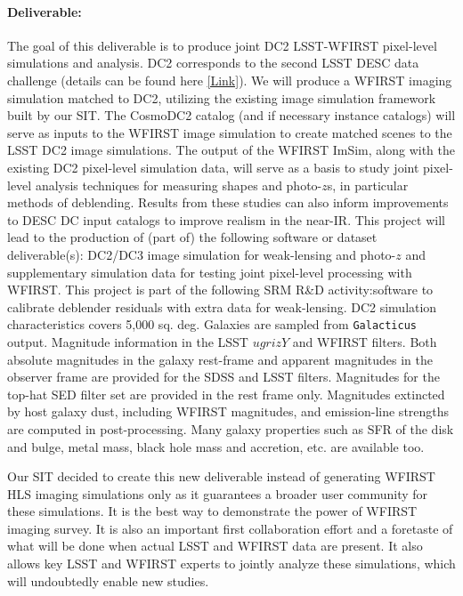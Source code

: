 \paragraph*{Deliverable:} The goal of this deliverable is to produce joint DC2
LSST-WFIRST pixel-level simulations and analysis. DC2 corresponds to the second
LSST DESC data challenge (details can be found here
\href{https://github.com/LSSTDESC/DC2-production/tree/master/Documents/DC2_Plan}{[Link]}).
We will produce a WFIRST imaging simulation matched to DC2, utilizing the
existing image simulation framework built by our SIT. The CosmoDC2 catalog (and
if necessary instance catalogs) will serve as inputs to the WFIRST image
simulation to create matched scenes to the LSST DC2 image simulations. The
output of the WFIRST ImSim, along with the existing DC2 pixel-level simulation
data, will serve as a basis to study joint pixel-level analysis techniques for
measuring shapes and photo-$z$s, in particular methods of deblending. Results
from these studies can also inform improvements to DESC DC input catalogs to
improve realism in the near-IR. This project will lead to the production of
(part of) the following software or dataset deliverable(s): DC2/DC3 image
simulation for weak-lensing and photo-$z$ and supplementary simulation data for
testing joint pixel-level processing with WFIRST. This project is part of the
following SRM R\&D activity:software to calibrate deblender residuals with extra
data for weak-lensing. DC2 simulation characteristics covers 5,000 sq. deg.
Galaxies are sampled from \texttt{Galacticus} output. Magnitude information in
the LSST $ugrizY$ and WFIRST filters. Both absolute magnitudes in the galaxy
rest-frame and apparent magnitudes in the observer frame are provided for the
SDSS and LSST filters. Magnitudes for the top-hat SED filter set are provided in
the rest frame only.  Magnitudes extincted by host galaxy dust, including WFIRST
magnitudes, and emission-line strengths are computed in post-processing. Many
galaxy properties such as SFR of the disk and bulge, metal mass, black hole mass
and accretion, etc. are available too.

Our SIT decided to create this new deliverable instead of generating WFIRST HLS
imaging simulations only as it guarantees a broader user community for these
simulations. It is the best way to demonstrate the power of WFIRST imaging
survey. It is also an important first collaboration effort and a foretaste of
what will be done when actual LSST and WFIRST data are present. It also allows
key LSST and WFIRST experts to jointly analyze these simulations, which will
undoubtedly enable new studies.

